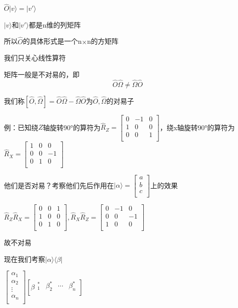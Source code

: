 \documentclass[lang=cn,10pt]{elegantbook}
\begin{document}
$\hat{O}|v\rangle =|v'\rangle$ 

$|v\rangle$和$|v'\rangle$都是n维的列矩阵

所以$\hat{O}$的具体形式是一个n$\times$n的方矩阵

我们只关心线性算符

矩阵一般是不对易的，即
\begin{equation*}
	\hat{O}\hat{\Omega}\ne \hat{\Omega}\hat{O}
\end{equation*}

我们称$\left[ \hat{O},\hat{\Omega} \right] =\hat{O}\hat{\Omega}-\hat{\Omega}\hat{O}
$为$\hat{O},\hat{\Omega}$的对易子

例：已知绕$Z$轴旋转90°的算符为$\hat{R}_Z=\left[ \begin{matrix}
	0&		-1&		0\\
	1&		0&		0\\
	0&		0&		1\\
\end{matrix} \right] $，绕x轴旋转90°的算符为$\hat{R}_X=\left[ \begin{matrix}
1&		0&		0\\
0&		0&		-1\\
0&		1&		0\\
\end{matrix} \right] $

他们是否对易？考察他们先后作用在$|\alpha\rangle=\left[ \begin{array}{c}
	a\\
	b\\
	c\\
\end{array} \right] $上的效果

$\hat{R}_Z\hat{R}_X=\left[ \begin{matrix}
	0&		0&		1\\
	1&		0&		0\\
	0&		1&		0\\
\end{matrix} \right] ,\hat{R}_X\hat{R}_Z=\left[ \begin{matrix}
	0&		-1&		0\\
	0&		0&		-1\\
	1&		0&		0\\
\end{matrix} \right] $

故不对易

现在我们考察$|\alpha \rangle \langle \beta |$

$\left[ \begin{array}{c}
	\alpha _1\\
	\alpha _2\\
	\vdots\\
	\alpha _n\\
\end{array} \right] \left[ \beta \begin{matrix}
	_{1}^{*}&		\beta _{2}^{*}&		\cdots&		\beta _{n}^{*}\\
\end{matrix} \right] $
\end{document}
